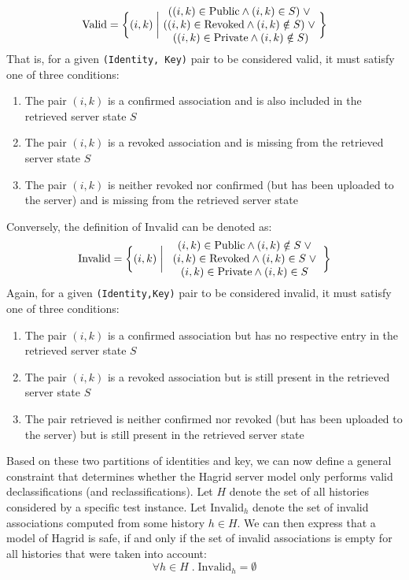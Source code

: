 \begin{equation}
    \text{Valid} = \biggl \{ (i,k) \;\bigg|\; \pctext{1.97in}{
        \( ((i,k) \in \text{Public}  \wedge (i,k) \in S)\; \vee \; \)
        \( ((i,k) \in \text{Revoked} \wedge (i,k) \notin S)\; \vee \; \)
        \( ((i,k) \in \text{Private} \wedge (i,k) \notin S) \) }  
    \biggr \}
\end{equation}
That is, for a given \texttt{(Identity, Key)} pair to be considered valid, it must satisfy one of three conditions: 
\begin{enumerate}
    \item The pair \((i,k)\) is a confirmed association and is also included in the retrieved server state \(S\)
    \item The pair \((i,k)\) is a revoked association and is missing from the retrieved server state \(S\)
    \item The pair \((i,k)\) is neither revoked nor confirmed (but has been uploaded to the server) and is missing from the retrieved server state
\end{enumerate}
Conversely, the definition of \(\text{Invalid}\) can be denoted as: 
\begin{equation}
    \text{Invalid} = \biggl \{
        (i,k) \;\bigg|\; \pctext{1.97in}{
            \((i,k) \in \text{Public}  \wedge (i,k) \notin S \; \vee \)
            \((i,k) \in \text{Revoked} \wedge (i,k) \in S \; \vee \)
            \((i,k) \in \text{Private} \wedge (i,k) \in S\)
        }
    \biggr \}
\end{equation}
Again, for a given \texttt{(Identity,Key)} pair to be considered invalid, it must satisfy one of three conditions:

\begin{enumerate}
    \item The pair \((i,k)\) is a confirmed association but has no respective entry in the retrieved server state \(S\)
    \item The pair \((i,k)\) is a revoked association but is still present in the retrieved server state \(S\)
    \item The pair retrieved is neither confirmed nor revoked (but has been uploaded to the server) but is still present in the retrieved server state
\end{enumerate}

Based on these two partitions of identities and key, we can now define a general constraint that determines whether the Hagrid server model only performs valid declassifications (and reclassifications). 
Let \(H\) denote the set of all histories considered by a specific test instance. Let \(\text{Invalid}_h\) denote the set of invalid associations computed from some history \(h \in H\). We can then express that a model of Hagrid is safe, if and only if the set of invalid associations is empty for all histories that were taken into account:
\[
    \forall h \in H \; .\; \text{Invalid}_h = \emptyset
\]

